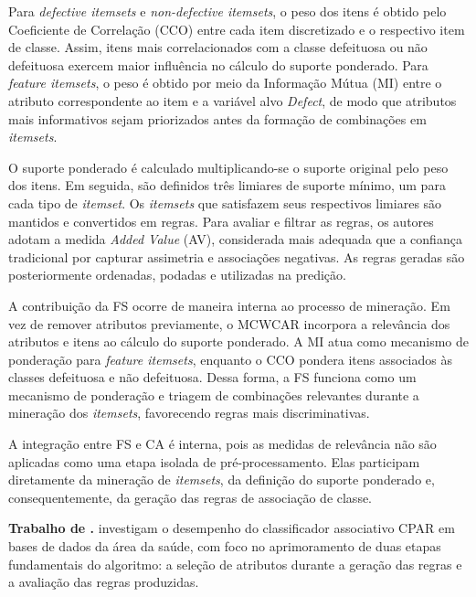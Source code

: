\begin{description}
    Para \textit{defective itemsets} e \textit{non-defective itemsets}, o peso dos itens é obtido pelo Coeficiente de Correlação (CCO) entre cada item discretizado e o respectivo item de classe. Assim, itens mais correlacionados com a classe defeituosa ou não defeituosa exercem maior influência no cálculo do suporte ponderado. Para \textit{feature itemsets}, o peso é obtido por meio da Informação Mútua (MI) entre o atributo correspondente ao item e a variável alvo \textit{Defect}, de modo que atributos mais informativos sejam priorizados antes da formação de combinações em \textit{itemsets}.

    \item[Geração, filtragem e predição.] O suporte ponderado é calculado multiplicando-se o suporte original pelo peso dos itens. Em seguida, são definidos três limiares de suporte mínimo, um para cada tipo de \textit{itemset}. Os \textit{itemsets} que satisfazem seus respectivos limiares são mantidos e convertidos em regras. Para avaliar e filtrar as regras, os autores adotam a medida \textit{Added Value} (AV), considerada mais adequada que a confiança tradicional por capturar assimetria e associações negativas. As regras geradas são posteriormente ordenadas, podadas e utilizadas na predição.

    \item[Contribuição da FS.] A contribuição da FS ocorre de maneira interna ao processo de mineração. Em vez de remover atributos previamente, o MCWCAR incorpora a relevância dos atributos e itens ao cálculo do suporte ponderado. A MI atua como mecanismo de ponderação para \textit{feature itemsets}, enquanto o CCO pondera itens associados às classes defeituosa e não defeituosa. Dessa forma, a FS funciona como um mecanismo de ponderação e triagem de combinações relevantes durante a mineração dos \textit{itemsets}, favorecendo regras mais discriminativas.

    \item[Forma de integração.] A integração entre FS e CA é interna, pois as medidas de relevância não são aplicadas como uma etapa isolada de pré-processamento. Elas participam diretamente da mineração de \textit{itemsets}, da definição do suporte ponderado e, consequentemente, da geração das regras de associação de classe.
\end{description}


\textbf{Trabalho de .} 
 investigam o desempenho do classificador associativo CPAR em bases de dados da área da saúde, com foco no aprimoramento de duas etapas fundamentais do algoritmo: a seleção de atributos durante a geração das regras e a avaliação das regras produzidas.

